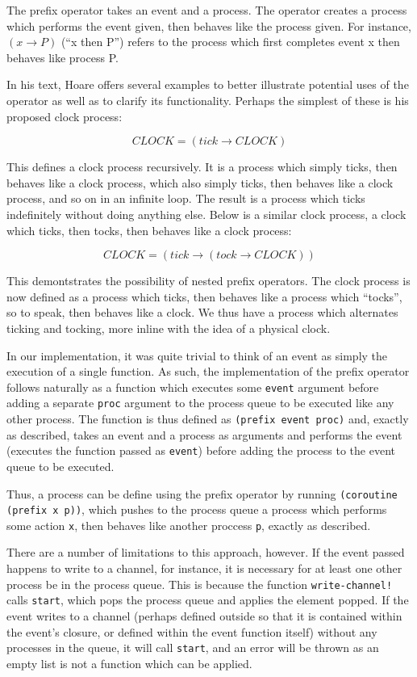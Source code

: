 \documentclass{article}
\begin{document}
The prefix operator takes an event and a process. The operator creates a process which performs the event given, then behaves
like the process given. For instance, $(x \rightarrow P)$ (``x then P'') refers to the process which first completes event x then behaves like process P.

In his text, Hoare offers several examples to better illustrate potential uses of the operator as well as to clarify its functionality. Perhaps the simplest of 
these is his proposed clock process:

\[ CLOCK = (tick \rightarrow CLOCK) \]

This defines a clock process recursively. It is a process which simply ticks, then behaves like a clock process, which also simply ticks, then behaves like a clock
process, and so on in an infinite loop. The result is a process which ticks indefinitely without doing anything else. Below is a similar clock process, a clock 
which ticks, then tocks, then behaves like a clock process:

\[ CLOCK = (tick \rightarrow (tock \rightarrow CLOCK)) \]

This demontstrates the possibility of nested prefix operators. The clock process is now defined as a process which ticks, then behaves like a process which 
``tocks'', so to speak, then behaves like a clock. We thus have a process which alternates ticking and tocking, more inline with the idea of a physical clock.

In our implementation, it was quite trivial to think of an event as simply the execution of a single function. As such, the implementation of the prefix operator
follows naturally as a function which executes some \texttt{event} argument before adding a separate \texttt{proc} argument to the process queue to be executed
like any other process. The function is thus defined as \texttt{(prefix event proc)} and, exactly as described, takes an event and a process as arguments and 
performs the event (executes the function passed as \texttt{event}) before adding the process to the event queue to be executed. 

Thus, a process can be define using the prefix operator by running \texttt{(coroutine (prefix x p))}, which pushes to the process queue a process which performs
some action \texttt{x}, then behaves like another proccess \texttt{p}, exactly as described.

There are a number of limitations to this approach, however. If the event passed happens to write to a channel, for instance, it is necessary for at least one 
other process be in the process queue. This is because the function \texttt{write-channel!} calls \texttt{start}, which pops the process queue and applies the
element popped. If the event writes to a channel (perhaps defined outside so that it is contained within the event's closure, or defined within the event function
itself) without any processes in the queue, it will call \texttt{start}, and an error will be thrown as an empty list is not a function which can be applied. 
\end{document}
